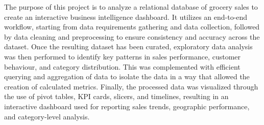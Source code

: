 The purpose of this project is to analyze a relational database of grocery sales to create an interactive business intelligence dashboard. It utilizes an end-to-end workflow, starting from data requirements gathering and data collection, followed by data cleaning and preprocessing to ensure consistency and accuracy across the dataset. Once the resulting dataset has been curated, exploratory data analysis was then performed to identify key patterns in sales performance, customer behaviour, and category distribution. This was complemented with efficient querying and aggregation of data to isolate the data in a way that allowed the creation of calculated metrics. Finally, the processed data was visualized through the use of pivot tables, KPI cards, slicers, and timelines, resulting in an interactive dashboard used for reporting sales trends, geographic performance, and category-level analysis. 
